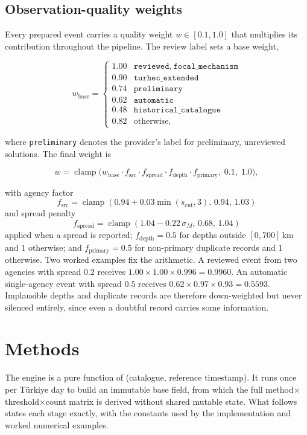 \documentclass[11pt,a4paper]{article}
\DeclareMathOperator{\clamp}{clamp}
\begin{document}
\subsection{Observation-quality weights}\label{sec:quality}
Every prepared event carries a quality weight $w\in[0.1,1.0]$ that
multiplies its contribution throughout the pipeline. The review label sets a
base weight,

\begin{equation}
w_{\text{base}} =
\begin{cases}
1.00 & \texttt{reviewed},\ \texttt{focal\_mechanism}\\
0.90 & \texttt{turhec\_extended}\\
0.74 & \texttt{preliminary}\\
0.62 & \texttt{automatic}\\
0.48 & \texttt{historical\_catalogue}\\
0.82 & \text{otherwise},
\end{cases}
\end{equation}

where \texttt{preliminary} denotes the provider's label for preliminary,
unreviewed solutions. The final weight is

\begin{equation}
w = \clamp\Big(w_{\text{base}}\cdot f_{\text{src}}\cdot f_{\text{spread}}
\cdot f_{\text{depth}}\cdot f_{\text{primary}},\;0.1,\;1.0\Big),
\end{equation}

with agency factor
\begin{equation}
f_{\text{src}}=\clamp(0.94+0.03\min(s_{\text{cnt}},3),\,0.94,\,1.03)
\end{equation}
and spread penalty
\begin{equation}
f_{\text{spread}}=\clamp(1.04-0.22\,\sigma_M,\,0.68,\,1.04)
\end{equation}
applied when a spread is reported; $f_{\text{depth}}=0.5$ for depths outside
$[0,700]$\,km and $1$ otherwise; and $f_{\text{primary}}=0.5$ for non-primary
duplicate records and $1$ otherwise. Two worked examples fix the arithmetic. A reviewed event from
two agencies with spread $0.2$ receives
$1.00\times1.00\times0.996=0.9960$. An automatic single-agency event with
spread $0.5$ receives $0.62\times0.97\times0.93=0.5593$. Implausible depths
and duplicate records are therefore down-weighted but never silenced
entirely, since even a doubtful record carries some information.

\section{Methods}\label{sec:methods}
The engine is a pure function of (catalogue, reference timestamp). It runs
once per T\"urkiye day to build an immutable base field, from which the full
method$\times$threshold$\times$count matrix is derived without shared mutable
state. What follows states each stage exactly, with the constants used by the
implementation and worked numerical examples.
\end{document}
